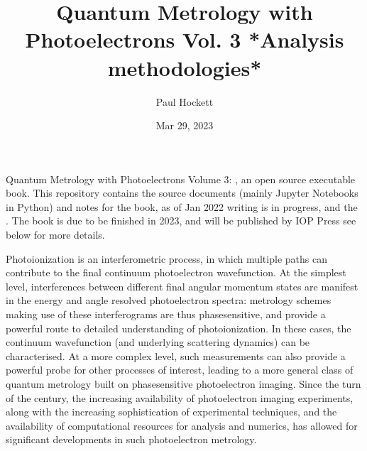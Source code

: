 \documentclass[letterpaper,table,10pt,english]{jupyterBook}
\title{Quantum Metrology with Photoelectrons Vol. 3 *Analysis methodologies*}
\date{Mar 29, 2023}
\author{Paul Hockett}
\begin{document}
\pagestyle{empty}
\sphinxmaketitle
\pagestyle{plain}
\sphinxtableofcontents
\pagestyle{normal}
\label{\detokenize{intro::doc}}


\sphinxAtStartPar
Quantum Metrology with Photoelectrons Volume 3: , an open source executable book. This repository contains the source documents (mainly Jupyter Notebooks in Python) and notes for the book, as of Jan 2022 writing is in progress, and the . The book is due to be finished in 2023, and will be published by IOP Press \sphinxhyphen{} see below for more details.

\begin{DUlineblock}{0em}
\item[] 
\end{DUlineblock}

\sphinxAtStartPar
Photoionization is an interferometric process, in which multiple paths can contribute to the final continuum photoelectron wavefunction. At the simplest level, interferences between different final angular momentum states are manifest in the energy and angle resolved photoelectron spectra: metrology schemes making use of these interferograms are thus phase\sphinxhyphen{}sensitive, and provide a powerful route to detailed understanding of photoionization. In these cases, the continuum wavefunction (and underlying scattering dynamics) can be characterised. At a more complex level, such measurements can also provide a powerful probe for other processes of interest, leading to a more general class of quantum metrology built on phase\sphinxhyphen{}sensitive photoelectron imaging.  Since the turn of the century, the increasing availability of photoelectron imaging experiments, along with the increasing sophistication of experimental techniques, and the availability of computational resources for analysis and numerics, has allowed for significant developments in such photoelectron metrology.

\begin{DUlineblock}{0em}
\item[] 
\end{DUlineblock}
\end{document}
